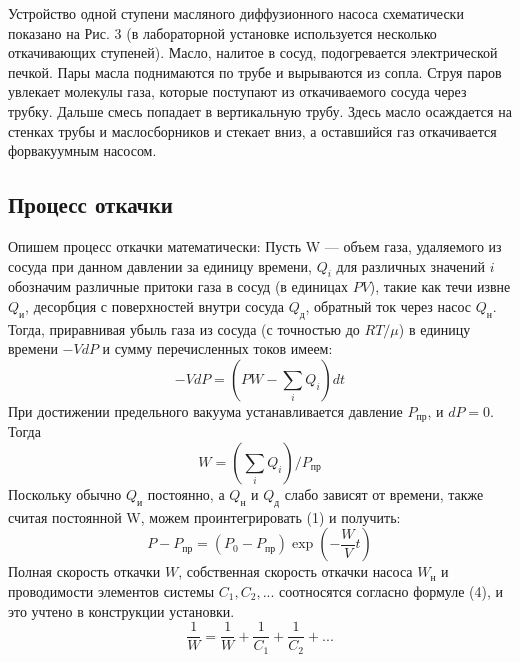 \documentclass[a4paper,12pt]{article}
\begin{document}
Устройство одной ступени масляного диффузионного насоса схематически показано на Рис. 3 (в лабораторной установке используется несколько откачивающих ступеней). Масло, налитое в сосуд, подогревается электрической печкой. Пары масла поднимаются по трубе и вырываются из сопла. Струя паров увлекает молекулы газа, которые поступают из откачиваемого сосуда через трубку. Дальше смесь попадает в вертикальную трубу. Здесь масло осаждается на стенках трубы и маслосборников и стекает вниз, а оставшийся газ откачивается форвакуумным насосом. 



\newpage

  
 \subsection*{Процесс откачки}
Опишем процесс откачки математически: 
Пусть W --- объем газа, удаляемого из сосуда при данном давлении за единицу времени, $Q_i$ для различных значений $i$ обозначим различные притоки газа в сосуд (в единицах $PV$), такие как течи извне $Q_\text{и}$, десорбция с поверхностей внутри сосуда $Q_\text{д}$, обратный ток через насос $Q_\text{н}$. Тогда, приравнивая убыль газа из сосуда (с точностью до $RT/\mu$) в единицу времени $-VdP$ и сумму перечисленных токов имеем:
 \begin{equation}
 	-VdP = (PW - \sum_i Q_i)dt
 \end{equation}
 При достижении предельного вакуума устанавливается давление $P_{\text{пр}}$, и $dP = 0$. Тогда
 \begin{equation}
 	 W = ( \sum_i Q_i )/P_{\text{пр}}
 \end{equation}
 Поскольку обычно $Q_\text{и}$ постоянно, а $Q_\text{н}$ и $Q_\text{д}$ слабо зависят от времени, также считая постоянной W, можем проинтегрировать (1) и получить:
 \begin{equation}
 	P - P_{\text{пр}} = (P_0 - P_{\text{пр}})\exp(-\frac{W}{V}t)
 \end{equation}
Полная скорость откачки $W$, собственная скорость откачки насоса $W_{\text{н}}$ и проводимости элементов системы $C_1, C_2,...$ соотносятся согласно формуле (4), и это учтено в конструкции установки.
 \begin{equation}
 \frac{1}{W} = \frac{1}{W} + \frac{1}{C_1} + \frac{1}{C_2} + ...
\end{equation}

\newpage
\end{document}
